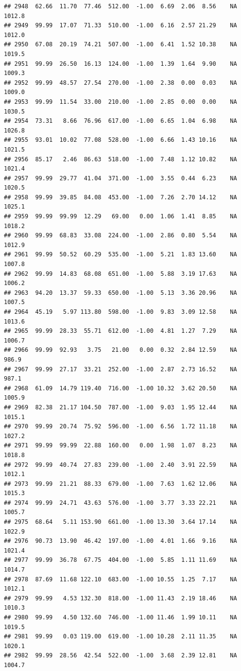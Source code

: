 \documentclass{article}\usepackage{graphicx, color}
\makeatletter
\newenvironment{kframe}{%
 \def\at@end@of@kframe{}%
 \ifinner\ifhmode%
  \def\at@end@of@kframe{\end{minipage}}%
  \begin{minipage}{\columnwidth}%
 \fi\fi%
 \def\FrameCommand##1{\hskip\@totalleftmargin \hskip-\fboxsep
 \colorbox{shadecolor}{##1}\hskip-\fboxsep
     \hskip-\linewidth \hskip-\@totalleftmargin \hskip\columnwidth}%
 \MakeFramed {\advance\hsize-\width
   \@totalleftmargin\z@ \linewidth\hsize
   \@setminipage}}%
 {\par\unskip\endMakeFramed%
 \at@end@of@kframe}
\newenvironment{knitrout}{}{} %
\makeatother
\begin{document}
\begin{knitrout}
\begin{kframe}
\begin{verbatim}
## 2948  62.66  11.70  77.46  512.00  -1.00  6.69  2.06  8.56    NA 1012.8
## 2949  99.99  17.07  71.33  510.00  -1.00  6.16  2.57 21.29    NA 1012.0
## 2950  67.08  20.19  74.21  507.00  -1.00  6.41  1.52 10.38    NA 1019.5
## 2951  99.99  26.50  16.13  124.00  -1.00  1.39  1.64  9.90    NA 1009.3
## 2952  99.99  48.57  27.54  270.00  -1.00  2.38  0.00  0.03    NA 1009.0
## 2953  99.99  11.54  33.00  210.00  -1.00  2.85  0.00  0.00    NA 1030.5
## 2954  73.31   8.66  76.96  617.00  -1.00  6.65  1.04  6.98    NA 1026.8
## 2955  93.01  10.02  77.08  528.00  -1.00  6.66  1.43 10.16    NA 1021.5
## 2956  85.17   2.46  86.63  518.00  -1.00  7.48  1.12 10.82    NA 1021.4
## 2957  99.99  29.77  41.04  371.00  -1.00  3.55  0.44  6.23    NA 1020.5
## 2958  99.99  39.85  84.08  453.00  -1.00  7.26  2.70 14.12    NA 1025.1
## 2959  99.99  99.99  12.29   69.00   0.00  1.06  1.41  8.85    NA 1018.2
## 2960  99.99  68.83  33.08  224.00  -1.00  2.86  0.80  5.54    NA 1012.9
## 2961  99.99  50.52  60.29  535.00  -1.00  5.21  1.83 13.60    NA 1007.8
## 2962  99.99  14.83  68.08  651.00  -1.00  5.88  3.19 17.63    NA 1006.2
## 2963  94.20  13.37  59.33  650.00  -1.00  5.13  3.36 20.96    NA 1007.5
## 2964  45.19   5.97 113.80  598.00  -1.00  9.83  3.09 12.58    NA 1013.6
## 2965  99.99  28.33  55.71  612.00  -1.00  4.81  1.27  7.29    NA 1006.7
## 2966  99.99  92.93   3.75   21.00   0.00  0.32  2.84 12.59    NA  986.9
## 2967  99.99  27.17  33.21  252.00  -1.00  2.87  2.73 16.52    NA  987.1
## 2968  61.09  14.79 119.40  716.00  -1.00 10.32  3.62 20.50    NA 1005.9
## 2969  82.38  21.17 104.50  787.00  -1.00  9.03  1.95 12.44    NA 1015.1
## 2970  99.99  20.74  75.92  596.00  -1.00  6.56  1.72 11.18    NA 1027.2
## 2971  99.99  99.99  22.88  160.00   0.00  1.98  1.07  8.23    NA 1018.8
## 2972  99.99  40.74  27.83  239.00  -1.00  2.40  3.91 22.59    NA 1012.1
## 2973  99.99  21.21  88.33  679.00  -1.00  7.63  1.62 12.06    NA 1015.3
## 2974  99.99  24.71  43.63  576.00  -1.00  3.77  3.33 22.21    NA 1005.7
## 2975  68.64   5.11 153.90  661.00  -1.00 13.30  3.64 17.14    NA 1022.9
## 2976  90.73  13.90  46.42  197.00  -1.00  4.01  1.66  9.16    NA 1021.4
## 2977  99.99  36.78  67.75  404.00  -1.00  5.85  1.11 11.69    NA 1014.7
## 2978  87.69  11.68 122.10  683.00  -1.00 10.55  1.25  7.17    NA 1012.1
## 2979  99.99   4.53 132.30  818.00  -1.00 11.43  2.19 18.46    NA 1010.3
## 2980  99.99   4.50 132.60  746.00  -1.00 11.46  1.99 10.11    NA 1019.5
## 2981  99.99   0.03 119.00  619.00  -1.00 10.28  2.11 11.35    NA 1020.1
## 2982  99.99  28.56  42.54  522.00  -1.00  3.68  2.39 12.81    NA 1004.7

\end{verbatim}
\end{kframe}
\end{knitrout}
\end{document}
